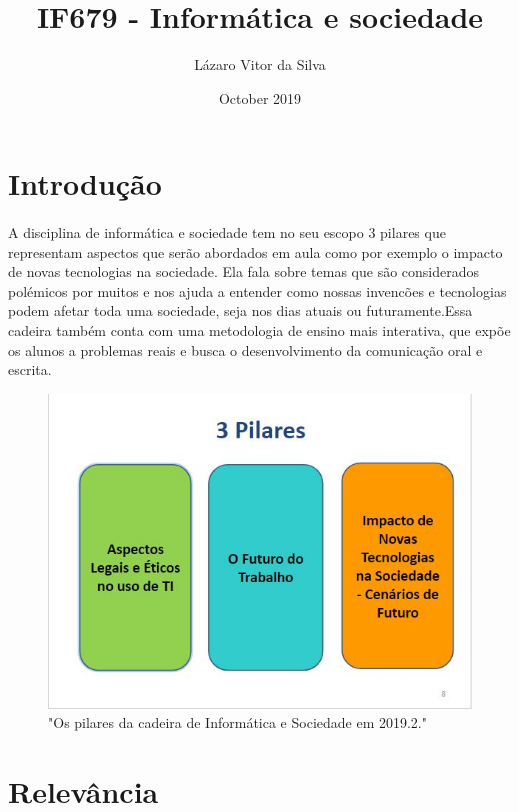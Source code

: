 \documentclass[10pt]{article}
\title{IF679 - Informática e sociedade}
\author{Lázaro Vitor da Silva }
\date{October 2019}
\begin{document}
\maketitle

\section{Introdução}
\paragraph{}A disciplina de informática e sociedade tem no seu escopo 3 pilares que representam aspectos que serão abordados em aula como por exemplo o impacto de novas tecnologias na sociedade. Ela fala sobre temas que são considerados polémicos por muitos e nos ajuda a entender como nossas invencões e tecnologias podem afetar toda uma sociedade, seja nos dias atuais ou futuramente.\newline Essa cadeira também conta com uma metodologia de ensino mais interativa, que expõe os alunos a problemas reais e busca o desenvolvimento da comunicação oral e escrita.\cite{pagina}
\begin{figure}[!htb]
     \centering
     \includegraphics[scale=0.4]{Try.jpg}
     \caption{"Os pilares da cadeira de Informática e Sociedade em 2019.2."}
     \label{fig:imagem1}
\end{figure}



\section{Relevância}
\end{document}
